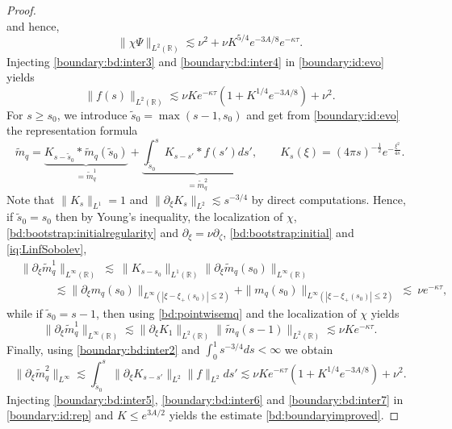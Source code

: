 \documentclass[11pt]{aims}
\theoremstyle{definition}
\newcommand{\pa}{\partial}
\newcommand{\be}{\begin{equation}}
\newcommand{\ee}{\end{equation}}
\numberwithin{equation}{section}
\begin{document}
\begin{proof}
$$$$
and hence,
\be \label{boundary:bd:inter4}
\| \chi \Psi \|_{L^2(\mathbb R)}\lesssim  \nu^2+\nu K^{5/4}e^{-3A/8}e^{-\kappa \tau}.
\ee
Injecting \eqref{boundary:bd:inter3} and \eqref{boundary:bd:inter4} in \eqref{boundary:id:evo} yields
\be \label{boundary:bd:inter2}
\| f(s) \|_{L^2(\mathbb R)}\lesssim  \nu K e^{-\kappa \tau}(1+K^{1/4}e^{-3A/8})+\nu^2.
\ee
For $s\geq s_0$, we introduce $\tilde s_0=\max(s-1,s_0)$ and get from \eqref{boundary:id:evo} the representation formula
\be \label{boundary:id:rep}
\tilde m_q=\underbrace{K_{s-\tilde s_0}*\tilde m_q(\tilde s_0)}_{=\tilde m_q^1}+\underbrace{\int_{\tilde s_0}^s K_{s-s'}*f(s')ds'}_{=\tilde m_q^2}, \qquad K_s(\xi)=(4\pi s)^{-\frac 12}e^{-\frac{\xi^2}{4s}}.
\ee
Note that $\| K_s\|_{L^1}=1$ and $\| \pa_\xi K_s\|_{L^2}\lesssim s^{-3/4}$ by direct computations. Hence, if $\tilde s_0=s_0$ then by Young's inequality, the localization of $\chi$, \eqref{bd:bootstrap:initialregularity} and $\pa_\xi=\nu\pa_\zeta$, \eqref{bd:bootstrap:initial} and \eqref{iq:LinfSobolev},
\begin{align} 
\nonumber & \|\pa_\xi \tilde m_q^1\|_{L^\infty(\mathbb R)} \ \lesssim  \  \| K_{s-s_0}\|_{L^1(\mathbb R)} \|\pa_\xi \tilde m_q(s_0)\|_{L^\infty (\mathbb R)} \\
\label{boundary:bd:inter5} &\qquad \quad \lesssim \|\pa_\xi m_q(s_0)\|_{L^\infty ( |\xi-\xi_+(s_0)|\leq 2 )}+\| m_q(s_0)\|_{L^\infty ( |\xi-\xi_+(s_0)|\leq 2 )} \  \lesssim \ \nu e^{-\kappa \tau},
\end{align}
while if $\tilde s_0=s-1$, then using \eqref{bd:pointwisemq} and the localization of $\chi$ yields
\be \label{boundary:bd:inter6}
\|\pa_\xi \tilde m_q^1\|_{L^\infty(\mathbb R)}\lesssim \|\pa_\xi K_1\|_{L^2(\mathbb R)}\| \tilde m_q(s-1)\|_{L^2(\mathbb R)}\lesssim \nu K e^{-\kappa \tau}.
\ee
Finally, using \eqref{boundary:bd:inter2} and $\int_{0}^1 s^{-3/4}ds<\infty$ we obtain
\be \label{boundary:bd:inter7}
\| \pa_\xi \tilde m_q^2\|_{L^\infty}\lesssim \int_{\tilde s_0}^s \| \pa_\xi K_{s-s'}\|_{L^2}\| f\|_{L^2}ds'\lesssim  \nu K e^{-\kappa \tau}(1+K^{1/4}e^{-3A/8})+\nu^2.
\ee
Injecting \eqref{boundary:bd:inter5}, \eqref{boundary:bd:inter6} and \eqref{boundary:bd:inter7} in \eqref{boundary:id:rep} and $K\leq e^{3 A/2}$ yields the estimate \eqref{bd:boundaryimproved}.
\end{proof}
\end{document}
